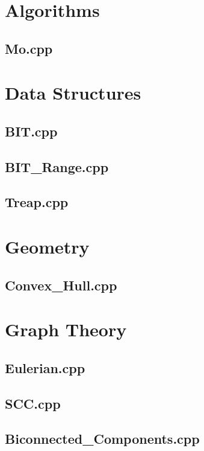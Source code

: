 \section{Algorithms}
\subsection{Mo.cpp}

\section{Data Structures}
\subsection{BIT.cpp}

\subsection{BIT\_Range.cpp}

\subsection{Treap.cpp}

\section{Geometry}
\subsection{Convex\_Hull.cpp}

\section{Graph Theory}
\subsection{Eulerian.cpp}

\subsection{SCC.cpp}

\subsection{Biconnected\_Components.cpp}

